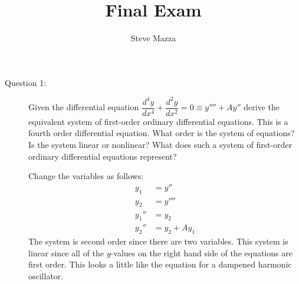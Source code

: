 \documentclass[letterpaper,10pt]{article}
\title{Final Exam}
\author{Steve Mazza}
\begin{document}
\maketitle

\begin{description}
\item[Question 1:]
Given the differential equation $\dfrac{d^4y}{dx^4}+\dfrac{d^2y}{dx^2}=0\equiv y''''+Ay''$ derive the equivalent system of first-order ordinary differential equations.  This is a fourth order differential equation.  What order is the system of equations?  Is the system linear or nonlinear?  What does such a system of first-order ordinary differential equations represent?


Change the variables as follows:
\begin{align*}
  y_1 &= y'' \\
  y_2 &= y'''' \\
  y_1'' &= y_2 \\
  y_2'' &= y_2 + Ay_1
\end{align*}
The system is second order since there are two variables.  This system is linear since all of the $y$-values on the right hand side of the equations are first order.  This looks a little like the equation for a dampened harmonic oscillator.


\end{description}
\end{document}
